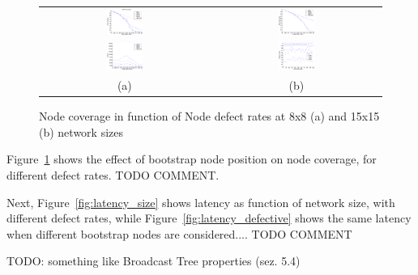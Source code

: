 \begin{figure}
  \centering
  \begin{tabular}{cc}
    \includegraphics[width=0.22\textwidth]{pictures/set1.eps} & 
    \includegraphics[width=0.22\textwidth]{pictures/coverage.eps} \\
    \includegraphics[width=0.22\textwidth]{pictures/set2.eps} & 
    \includegraphics[width=0.22\textwidth]{pictures/set3.eps} \\
    (a) & (b)
  \end{tabular}
  \caption{Node coverage in function of Node defect rates at 8x8 (a) and 15x15 (b) network sizes}
  \label{fig:bootstrap}
\end{figure}

Figure~\ref{fig:bootstrap} shows the effect of bootstrap node position
on node coverage, for different defect rates. TODO COMMENT.



Next, Figure~\ref{fig:latency_size} shows latency as function of
network size, with different defect rates, while Figure~\ref{fig:latency_defective}
shows the same latency when different bootstrap nodes are
considered.... TODO COMMENT

TODO: something like Broadcast Tree properties (sez.  5.4)

